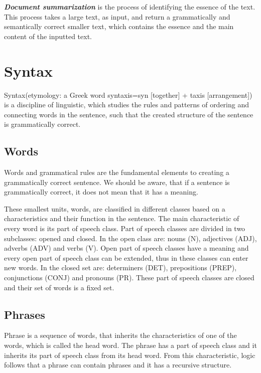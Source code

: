 \emph{\textbf{Document summarization}}  is the process of identifying the essence of the text. This process takes a large text, as input, and return a grammatically and semantically correct smaller text, which contains the essence and the main content of the inputted text. \\

\section{Syntax}

Syntax(etymology: a Greek word syntaxis=syn [together] + taxis [arrangement]) is a discipline of linguistic, which studies the rules and patterns of ordering and connecting words in the sentence, such that the created structure of the sentence is grammatically correct. 

\subsection{Words}

Words and grammatical rules are the fundamental elements to creating a grammatically correct sentence. We should be aware, that if a sentence is grammatically correct, it does not mean that it has a meaning.

These smallest units, words, are classified in different classes based on a characteristics and their function in the sentence. The main characteristic of every word is its part of speech class. Part of speech classes are divided in two subclasses: opened and closed. In the open class are: nouns (N), adjectives (ADJ), adverbs (ADV) and verbs (V). Open part of speech classes have a meaning and every open part of speech class can be extended, thus in these  classes can enter new words. In the closed set are: determiners (DET), prepositions (PREP), conjunctions (CONJ) and pronouns (PR). These part of speech classes are closed and their set of words is a fixed set.

\subsection{Phrases}

Phrase is a sequence of words, that inherits the characteristics of one of the words, which is called the head word. The phrase has a part of speech class and it inherits its part of speech class from its head word. From this characteristic, logic follows that a phrase can contain phrases and it has a recursive structure.

